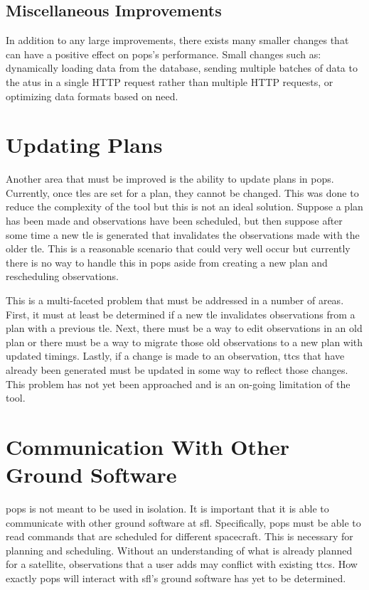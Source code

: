 \subsection{Miscellaneous Improvements}

In addition to any large improvements, there exists many smaller changes that
can have a positive effect on \gls{pops}'s performance. Small changes such as:
dynamically loading data from the database, sending multiple batches of data to
the \glspl{atu} in a single HTTP request rather than multiple HTTP requests, or
optimizing data formats based on need.


\section{Updating Plans}

Another area that must be improved is the ability to update plans in
\gls{pops}. Currently, once \glspl{tle} are set for a plan, they cannot be
changed. This was done to reduce the complexity of the tool but this is not an
ideal solution.  Suppose a plan has been made and observations have been
scheduled, but then suppose after some time a new \gls{tle} is generated that
invalidates the observations made with the older \gls{tle}. This is a
reasonable scenario that could very well occur but currently there is no way to
handle this in \gls{pops} aside from creating a new plan and rescheduling
observations.

This is a multi-faceted problem that must be addressed in a number of areas.
First, it must at least be determined if a new \gls{tle} invalidates
observations from a plan with a previous \gls{tle}. Next, there must be a way
to edit observations in an old plan or there must be a way to migrate those old
observations to a new plan with updated timings. Lastly, if a change is made to
an observation, \glspl{ttc} that have already been generated must be updated in
some way to reflect those changes. This problem has not yet been approached and
is an on-going limitation of the tool.


\section{Communication With Other Ground Software}

\gls{pops} is not meant to be used in isolation. It is important that it is
able to communicate with other ground software at \gls{sfl}. Specifically,
\gls{pops} must be able to read commands that are scheduled for different
spacecraft. This is necessary for planning and scheduling.  Without an
understanding of what is already planned for a satellite, observations that a
user adds may conflict with existing \glspl{ttc}.  How exactly \gls{pops} will
interact with \gls{sfl}'s ground software has yet to be determined.  

